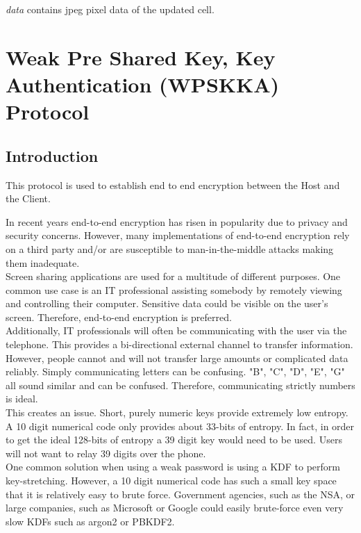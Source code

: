 \documentclass{article}
\begin{document}
    \emph{data} contains jpeg pixel data of the updated cell.

    \newpage


    \section{Weak Pre Shared Key, Key Authentication (WPSKKA) Protocol}

    \subsection{Introduction}

    This protocol is used to establish end to end encryption between the Host and the Client.

    In recent years end-to-end encryption has risen in popularity due to privacy and
    security concerns. However, many implementations of end-to-end encryption rely
    on a third party and/or are susceptible to man-in-the-middle attacks making them
    inadequate.\\

    Screen sharing applications are used for a multitude of different purposes. One
    common use case is an IT professional assisting somebody by remotely viewing and
    controlling their computer. Sensitive data could be visible on the user's
    screen. Therefore, end-to-end encryption is preferred.\\

    Additionally, IT professionals will often be communicating with the user via the
    telephone. This provides a bi-directional external channel to transfer
    information. However, people cannot and will not transfer large amounts or
    complicated data reliably. Simply communicating letters can be confusing. "B",
    "C", "D", "E", "G" all sound similar and can be confused. Therefore,
    communicating strictly numbers is ideal.\\

    This creates an issue. Short, purely numeric keys provide extremely low entropy.
    A 10 digit numerical code only provides about 33-bits of entropy. In fact, in
    order to get the ideal 128-bits of entropy a 39 digit key would need to be used.
    Users will not want to relay 39 digits over the phone.\\

    One common solution when using a weak password is using a KDF to perform
    key-stretching. However, a 10 digit numerical code has such a small key space
    that it is relatively easy to brute force. Government agencies, such as the NSA,
    or large companies, such as Microsoft or Google could easily brute-force even
    very slow KDFs such as argon2 or PBKDF2.\\
\end{document}
